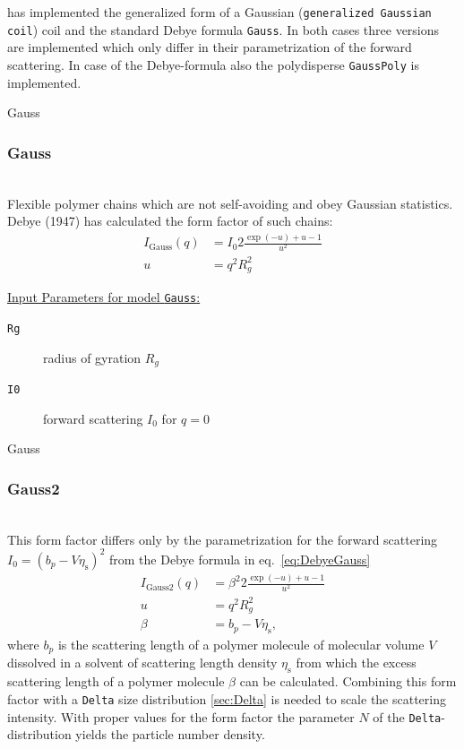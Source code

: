 \SASfit has implemented the generalized form of a Gaussian (\texttt{generalized Gaussian coil}) coil and the standard
Debye formula \texttt{Gauss}. In both cases three versions are implemented which only differ in their parametrization of the forward scattering. In case of the Debye-formula also the polydisperse \texttt{GaussPoly} is implemented.

\textcolor[rgb]{1.00,1.00,1.00}{Gauss}\\
\subsubsection{Gauss }
\label{sect:Gauss}
~\\
Flexible polymer chains which are not self-avoiding
and obey Gaussian statistics. Debye (1947) \cite{Debye1947} has calculated the form factor of such
chains:
\begin{align}
I_\text{Gauss}(q) &= I_0 2\frac{\exp(-u)+u-1}{u^2} \label{eq:DebyeGauss}\\
u &= q^2R_g^2
\end{align}

\vspace{5mm}
\uline{Input Parameters for model \texttt{Gauss}:}
\begin{description}
\item[\texttt{Rg}] radius of gyration $R_g$
\item[\texttt{I0}] forward scattering $I_0$ for $q=0$
\end{description}
\vspace{5mm}

\textcolor[rgb]{1.00,1.00,1.00}{Gauss}\\
\subsubsection{Gauss2}
\label{sect:Gauss2}
~\\
This form factor \cite{Debye1947} differs only by the parametrization for the forward scattering
$I_0=(b_p-V\eta_\text{s})^2$ from the Debye formula in eq.\ \ref{eq:DebyeGauss}
\begin{align}
I_\text{Gauss2}(q) &= \beta^2 2\frac{\exp(-u)+u-1}{u^2} \\
u &= q^2R_g^2 \nonumber \\
\beta &= b_p-V\eta_\text{s}, \nonumber
\end{align}
where $b_p$ is the scattering length of a polymer molecule of molecular volume $V$ dissolved in a solvent
of scattering length density $\eta_\text{s}$ from which the excess scattering length of a polymer molecule
$\beta$ can be calculated. Combining this form factor with a \texttt{Delta} size distribution \ref{sec:Delta}
is needed to scale the scattering intensity. With proper values for the form factor the parameter $N$
of the \texttt{Delta}-distribution yields the particle number density.

